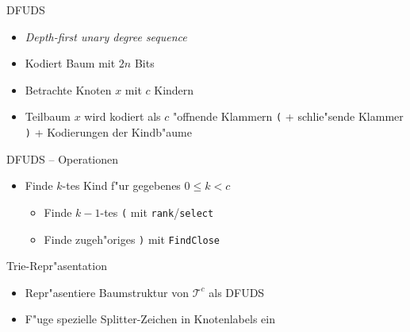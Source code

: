 \documentclass[ngerman,hyperref={pdfpagelabels=true}]{beamer}
\newcommand\T{\mathcal{T}}
\begin{document}
\begin{frame}{DFUDS}
\begin{itemize}
\item \emph{Depth-first unary degree sequence}
\item Kodiert Baum mit $2n$ Bits
\item Betrachte Knoten $x$ mit $c$ Kindern
\item Teilbaum $x$ wird kodiert als $c$ "offnende Klammern \lstinline|(| +
schlie"sende Klammer \lstinline|)| + Kodierungen der Kindb"aume
\end{itemize}
\vspace{1em}

\end{frame}

\begin{frame}{DFUDS -- Operationen}


\vspace{1em}

\begin{itemize}
\item Finde $k$-tes Kind f"ur gegebenes $0 \le k < c$
\begin{itemize}
\item Finde $k - 1$-tes \lstinline|(| mit \lstinline|rank|/\lstinline|select|
\item Finde zugeh"origes \lstinline|)| mit \lstinline|FindClose|
\end{itemize}
\end{itemize}
\end{frame}

\begin{frame}{Trie-Repr"asentation}

\begin{itemize}

\item Repr"asentiere Baumstruktur von $\T^c$ als DFUDS
\item F"uge spezielle Splitter-Zeichen in Knotenlabels ein
\end{itemize}

\centering



\end{frame}
\end{document}
